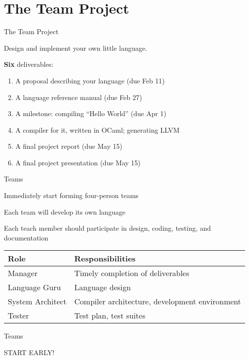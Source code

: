 \documentclass{plt}
\begin{document}
\part{The Team Project}

\begin{frame}{The Team Project}

Design and implement your own little language.

\textbf{Six} deliverables:

\begin{enumerate}
\item A proposal describing your language (due Feb 11)
\item A language reference manual (due Feb 27)
\item A milestone: compiling ``Hello World'' (due Apr 1)
\item A compiler for it, written in OCaml; generating LLVM
\item A final project report (due May 15)
\item A final project presentation (due May 15)
\end{enumerate}

\end{frame}

\begin{frame}{Teams}

Immediately start forming four-person teams

Each team will develop its own language

Each teach member should participate in design, coding, testing, and
documentation

\renewcommand\arraystretch{1.2}
\begin{tabular}{lp{15pc}}
\toprule
\textbf{Role} & \textbf{Responsibilities} \\
\midrule
Manager & Timely completion of deliverables \\
Language Guru & Language design \\
System Architect & Compiler architecture, \hfill\break development environment \\
Tester & Test plan, test suites \\
\bottomrule
\end{tabular}

\end{frame}

\begin{frame}{Teams}

\begin{center}
\Huge{START EARLY!}
\end{center}
\end{frame}
\end{document}
